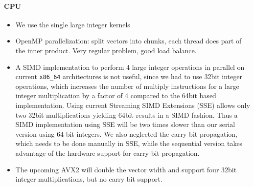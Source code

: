 \documentclass[oribibl]{llncs2e/llncs}
\begin{document}
\paragraph{CPU}
\begin{itemize}
\item We use the single large integer kernels
\item OpenMP parallelization: split vectors into chunks, each thread does part of the inner product. Very regular problem, good load balance.
\item A SIMD implementation to perform 4 large integer operations in parallel on current \verb|x86_64| architectures is not useful, since we had to use 32bit integer operations, which increases the number of multiply instructions for a large integer multiplication by a factor of 4 compared to the 64bit based implementation.
Using current Streaming SIMD Extensions (SSE) allows only two 32bit multiplications yielding 64bit results in a SIMD fashion.
Thus a SIMD implementation using SSE will be two times slower than our serial version using 64 bit integers.
We also neglected the carry bit propagation, which needs to be done manually in SSE, while the sequential version takes advantage of the hardware support for carry bit propagation.
\item The upcoming AVX2 will double the vector width and support four 32bit integer multiplications, but no carry bit support.
\end{itemize}
\end{document}
